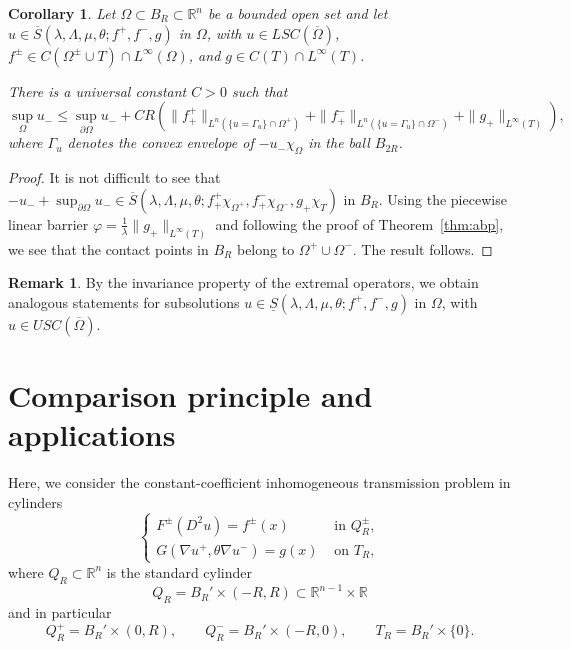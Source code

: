 \documentclass[letter,11pt]{amsart}
\newcommand{\R}{\mathbb{R}}
\newcommand{\chara}[1]{\chi_{#1}}
\newcommand{\uppers}{USC}
\newcommand{\lowers}{LSC}
\newtheorem{cor}[thm]{Corollary}
\theoremstyle{definition}
\newtheorem{rem}[thm]{Remark}
\numberwithin{equation}{section}
\begin{document}
\begin{cor}
Let $\Omega \subset B_R \subset \R^n$ be a bounded open set and let $u \in \overline{S}(\lambda,\Lambda,\mu, \theta; f^{+}, f^{-}, g)$ in $\Omega$, with $u \in \lowers(\overline{\Omega})$, $f^{\pm} \in C(\Omega^{\pm}\cup T) \cap L^{\infty}(\Omega)$, and $g \in C(T) \cap L^{\infty}(T)$.

There is a universal constant $C > 0$ such that
\[
\sup_{\Omega} u_{-} \leq \sup_{\partial \Omega} u_{-} + 
C R \left( 
\|f_{+}^{+}\|_{L^{n}(\{u = \Gamma_u\} \cap \Omega^{+})} 
+ \|f_{+}^{-}\|_{L^{n}(\{u = \Gamma_u\} \cap \Omega^{-})}
+\|g_{+}\|_{L^{\infty}(T)}
\right),
\]
where $\Gamma_u$ denotes the convex envelope of $- u_{-} \chara{\Omega}$ in the ball $B_{2 R}$.
\end{cor}
\begin{proof}
It is not difficult to see that
$- u_{-} + \sup_{\partial \Omega} u_{-} \in \overline{S}(\lambda,\Lambda,\mu,\theta; f^{+}_{+}\chara{\Omega^{+}},f^{-}_{+} \chara{\Omega^{-}},g_{+} \chara{T})$ in $B_R$.
Using the piecewise linear barrier $\varphi = \frac{1}{\lambda} \|g_{+}\|_{L^{\infty}(T)}$ and following the proof of Theorem~\ref{thm:abp}, we see that the contact points in $B_{R}$ belong to $\Omega^{+} \cup \Omega^{-}$.
The result follows.
\end{proof}


\begin{rem}
By the invariance property of the extremal operators, we obtain analogous statements for subsolutions $u \in \underline{S}(\lambda, \Lambda, \mu, \theta; f^{+}, f^{-}, g)$ in $\Omega$, with $u \in \uppers(\overline{\Omega})$.
\end{rem}


\medskip

\section{Comparison principle and applications}
\label{sec:unique}

Here, we consider the constant-coefficient inhomogeneous transmission problem in cylinders
\begin{equation}
\label{eq:const}
\begin{cases}
F^{\pm}(D^2 u) = f^{\pm}(x) & \text{ in } Q_R^{\pm},\\
G(\nabla u^{+}, \theta \nabla u^{-}) = g(x) &\text{ on } T_R,
\end{cases}
\end{equation}
where $Q_R \subset \R^{n}$ is the standard cylinder
\[
Q_{R} = B_R' \times (-R, R) \subset \R^{n-1} \times \R
\]
and in particular
\[
Q_{R}^{+} = B_R' \times (0, R), \qquad Q_{R}^{-} = B_R' \times (-R, 0), \qquad T_R = B_R' \times \{0\}.
\]
\end{document}
